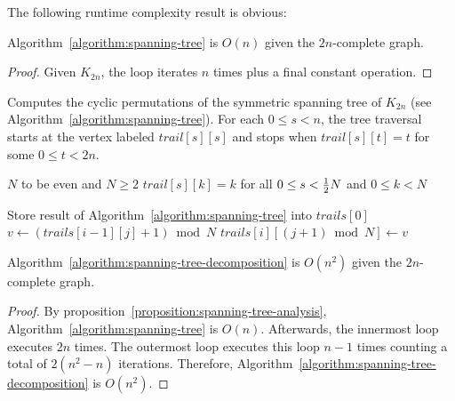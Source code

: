 \documentclass{article}
\begin{document}
The following runtime complexity result is obvious:

\begin{proposition}\label{proposition:spanning-tree-analysis}
Algorithm~\ref{algorithm:spanning-tree} is $O(n)$ given the $2n$-complete graph.
\begin{proof}
Given $K_{2n}$, the loop iterates $n$ times plus a final constant operation.
\end{proof}
\end{proposition}

\begin{algorithm}
\caption{Computes the cyclic permutations of the symmetric spanning tree of $K_{2n}$ (see Algorithm~\ref{algorithm:spanning-tree}). For each $0 \leq s < n$, the tree traversal starts at the vertex labeled $trail[s][s]$ and stops when $trail[s][t]=t$ for some $0 \leq t < 2n$.}
\label{algorithm:spanning-tree-decomposition}
\begin{algorithmic}
\REQUIRE $N$ to be even and $N \geq 2$ 
\REQUIRE $trail[s][k] = k$ for all $0 \leq s < \frac{1}{2} N$ and $0 \leq k < N$

\STATE Store result of Algorithm~\ref{algorithm:spanning-tree} into $trails[0]$
\STATE $v \leftarrow (trails[i - 1][j] + 1) \bmod N$
\STATE $trails[i][(j + 1) \bmod N] \leftarrow v$
\ENDFOR
\ENDFOR
\end{algorithmic}
\end{algorithm}

\begin{proposition}
Algorithm~\ref{algorithm:spanning-tree-decomposition} is $O(n^2)$ given the $2n$-complete graph.
\begin{proof}
By proposition~\eqref{proposition:spanning-tree-analysis}, Algorithm~\ref{algorithm:spanning-tree} is $O(n)$. Afterwards, the innermost loop executes $2n$ times. The outermost loop executes this loop $n - 1$ times counting a total of $2(n^2 - n)$ iterations. Therefore, Algorithm~\ref{algorithm:spanning-tree-decomposition} is $O(n^2)$.
\end{proof}
\end{proposition}
\end{document}
